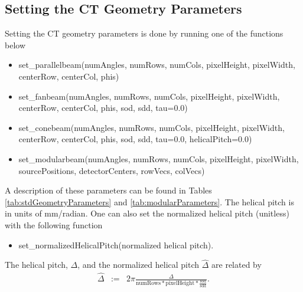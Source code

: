 \documentclass[11pt]{article}
\begin{document}
\subsection{Setting the CT Geometry Parameters}

Setting the CT geometry parameters is done by running one of the functions below
\begin{itemize}
\item[] set\_parallelbeam(numAngles, numRows, numCols, pixelHeight, pixelWidth, centerRow, centerCol, phis)
\item[] set\_fanbeam(numAngles, numRows, numCols, pixelHeight, pixelWidth, centerRow, centerCol, phis, sod, sdd, tau=0.0)
\item[] set\_conebeam(numAngles, numRows, numCols, pixelHeight, pixelWidth, centerRow, centerCol, phis, sod, sdd, tau=0.0, helicalPitch=0.0)
\item[] set\_modularbeam(numAngles, numRows, numCols, pixelHeight, pixelWidth, sourcePositions, detectorCenters, rowVecs, colVecs)
\end{itemize}
A description of these parameters can be found in Tables \ref{tab:stdGeometryParameters} and \ref{tab:modularParameters}.  The helical pitch is in units of mm/radian.  One can also set the normalized helical pitch (unitless) with the following function
\begin{itemize}
    \item[] set\_normalizedHelicalPitch(normalized helical pitch).
\end{itemize}
The helical pitch, $\Delta$, and the normalized helical pitch $\widehat{\Delta}$ are related by
\begin{eqnarray*}
\widehat{\Delta} &:=& 2\pi \frac{\Delta}{\text{numRows} * \text{pixelHeight} * \frac{\text{sod}}{\text{sdd}}}.
\end{eqnarray*}
\end{document}
